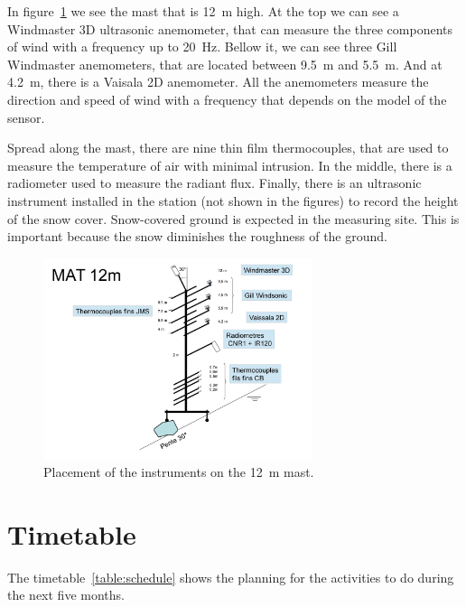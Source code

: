 \documentclass[a4paper,12pt]{article}
\begin{document}
In figure~\ref{fig:mast_12} we see the mast that is 12~m high. At the top we can see a Windmaster 3D ultrasonic anemometer, that can measure the three components of wind with a frequency up to 20~Hz. Bellow it, we can see three Gill Windmaster anemometers, that are located between 9.5~m and 5.5~m. And at 4.2~m, there is a Vaisala 2D anemometer.  All the anemometers measure the direction and speed of wind with a frequency that depends on the model of the sensor. 

Spread along the mast, there are nine thin film thermocouples, that are used to measure the temperature of air with minimal intrusion. In the middle, there is a radiometer used to measure the radiant flux. Finally, there is an ultrasonic instrument installed in the station (not shown in the figures) to record the height of the snow cover. Snow-covered ground is expected in the measuring site. This is important because the snow diminishes the roughness of the ground.

\begin{figure}[!ht]
  \begin{center}
  \includegraphics[width=0.7\textwidth]{fig/0002.jpg}
  \caption{Placement of the instruments on the 12~m mast.}
  \label{fig:mast_12}
  \end{center}
\end{figure}

\section{Timetable}
The timetable~\ref{table:schedule} shows the planning for the activities to do during the next five months. 
\end{document}
